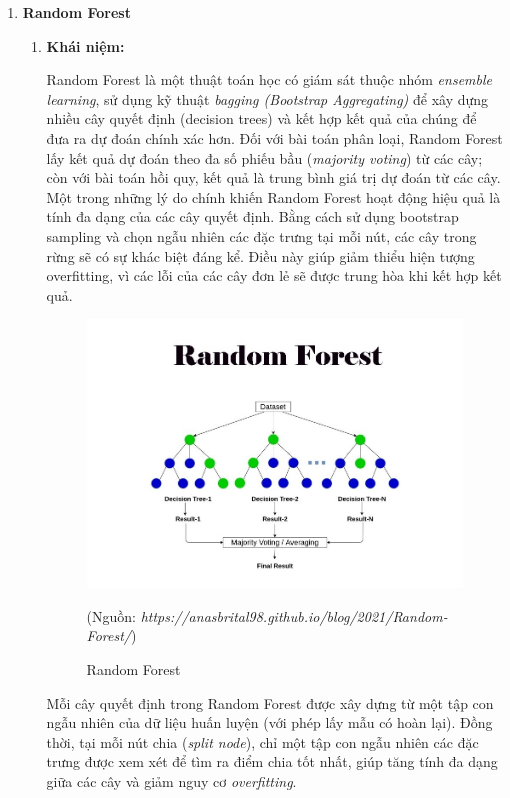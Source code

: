 \documentclass[13pt]{article}
\begin{document}
\begin{enumerate}
    \item \textbf{Random Forest}
    \begin{enumerate}
        \item \textbf{Khái niệm: }

        Random Forest là một thuật toán học có giám sát thuộc nhóm \textit{ensemble learning}, sử dụng kỹ thuật \textit{bagging (Bootstrap Aggregating)} để xây dựng nhiều cây quyết định (decision trees) và kết hợp kết quả của chúng để đưa ra dự đoán chính xác hơn. Đối với bài toán phân loại, Random Forest lấy kết quả dự đoán theo đa số phiếu bầu (\textit{majority voting}) từ các cây; còn với bài toán hồi quy, kết quả là trung bình giá trị dự đoán từ các cây. Một trong những lý do chính khiến Random Forest hoạt động hiệu quả là tính đa dạng của các cây quyết định. Bằng cách sử dụng bootstrap sampling và chọn ngẫu nhiên các đặc trưng tại mỗi nút, các cây trong rừng sẽ có sự khác biệt đáng kể. Điều này giúp giảm thiểu hiện tượng overfitting, vì các lỗi của các cây đơn lẻ sẽ được trung hòa khi kết hợp kết quả.

    \begin{figure}[h!]
        \centering        \includegraphics[width=0.7\linewidth]{image/h10.jpg}
            \caption{Random Forest}
            \label{fig:label1}
            (Nguồn: \textit{https://anasbrital98.github.io/blog/2021/Random-Forest/})
    \end{figure} 

        Mỗi cây quyết định trong Random Forest được xây dựng từ một tập con ngẫu nhiên của dữ liệu huấn luyện (với phép lấy mẫu có hoàn lại). Đồng thời, tại mỗi nút chia (\textit{split node}), chỉ một tập con ngẫu nhiên các đặc trưng được xem xét để tìm ra điểm chia tốt nhất, giúp tăng tính đa dạng giữa các cây và giảm nguy cơ \textit{overfitting}.


\end{enumerate}
\end{enumerate}
\end{document}
